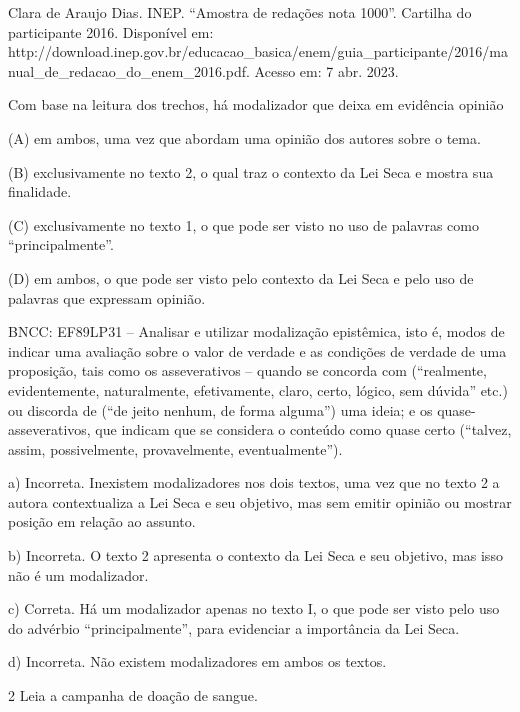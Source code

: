 \begin{itemize}
\begin{itemize}
{\begin{itemize}
\begin{itemize}
Clara de Araujo Dias. INEP. ``Amostra de redações nota 1000''. Cartilha
do participante 2016. Disponível em:
http://download.inep.gov.br/educacao\_basica/enem/guia\_participante/2016/manual\_de\_redacao\_do\_enem\_2016.pdf.
Acesso em: 7 abr. 2023.

Com base na leitura dos trechos, há modalizador que deixa em evidência
opinião

(A) em ambos, uma vez que abordam uma opinião dos autores sobre o tema.

(B) exclusivamente no texto 2, o qual traz o contexto da Lei Seca e
mostra sua finalidade.

(C) exclusivamente no texto 1, o que pode ser visto no uso de palavras
como ``principalmente''.

(D) em ambos, o que pode ser visto pelo contexto da Lei Seca e pelo uso
de palavras que expressam opinião.

BNCC: EF89LP31 -- Analisar e utilizar modalização epistêmica, isto é,
modos de indicar uma avaliação sobre o valor de verdade e as condições
de verdade de uma proposição, tais como os asseverativos -- quando se
concorda com (``realmente, evidentemente, naturalmente, efetivamente,
claro, certo, lógico, sem dúvida'' etc.) ou discorda de (``de jeito
nenhum, de forma alguma'') uma ideia; e os quase-asseverativos, que
indicam que se considera o conteúdo como quase certo (``talvez, assim,
possivelmente, provavelmente, eventualmente'').

a) Incorreta. Inexistem modalizadores nos dois textos, uma vez que no
texto 2 a autora contextualiza a Lei Seca e seu objetivo, mas sem emitir
opinião ou mostrar posição em relação ao assunto.

b) Incorreta. O texto 2 apresenta o contexto da Lei Seca e seu objetivo,
mas isso não é um modalizador.

c) Correta. Há um modalizador apenas no texto I, o que pode ser visto
pelo uso do advérbio ``principalmente'', para evidenciar a importância
da Lei Seca.

d) Incorreta. Não existem modalizadores em ambos os textos.

\num{2} Leia a campanha de doação de sangue.


\end{itemize}
\end{itemize}}
\end{itemize}
\end{itemize}
